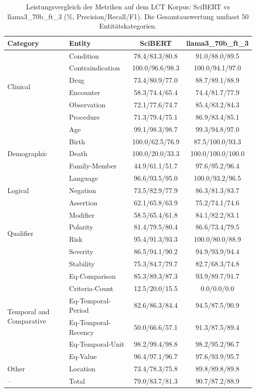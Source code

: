 
\begin{table}[htbp]
\centering
\begin{tabular}{llcc}
\toprule
\textbf{Category} & \textbf{Entity} & \textbf{SciBERT} & \textbf{llama3_70b_ft_3} \\
\midrule
\multirow{6}{*}{Clinical} & Condition & 78.4/83.3/80.8 & 91.0/88.0/89.5 \\
 & Contraindication & 100.0/96.6/98.3 & 100.0/94.1/97.0 \\
 & Drug & 73.4/80.9/77.0 & 88.7/89.1/88.9 \\
 & Encounter & 58.3/74.4/65.4 & 74.4/81.7/77.9 \\
 & Observation & 72.1/77.6/74.7 & 85.4/83.2/84.3 \\
 & Procedure & 71.3/79.4/75.1 & 86.9/83.4/85.1 \\
\midrule
\multirow{5}{*}{Demographic} & Age & 99.1/98.3/98.7 & 99.3/94.8/97.0 \\
 & Birth & 100.0/62.5/76.9 & 87.5/100.0/93.3 \\
 & Death & 100.0/20.0/33.3 & 100.0/100.0/100.0 \\
 & Family-Member & 44.9/61.1/51.7 & 97.6/95.2/96.4 \\
 & Language & 96.6/93.5/95.0 & 100.0/93.2/96.5 \\
\midrule
Logical & Negation & 73.5/82.9/77.9 & 86.3/81.3/83.7 \\
\midrule
\multirow{6}{*}{Qualifier} & Assertion & 62.1/65.8/63.9 & 75.2/74.1/74.6 \\
 & Modifier & 58.5/65.4/61.8 & 84.1/82.2/83.1 \\
 & Polarity & 81.4/79.5/80.4 & 86.6/73.4/79.5 \\
 & Risk & 95.4/91.3/93.3 & 100.0/80.0/88.9 \\
 & Severity & 86.5/94.1/90.2 & 94.9/93.9/94.4 \\
 & Stability & 75.3/84.7/79.7 & 82.7/68.3/74.8 \\
\midrule
\multirow{6}{*}{Temporal and Comparative} & Eq-Comparison & 85.3/89.3/87.3 & 93.9/89.7/91.7 \\
 & Criteria-Count & 12.5/20.0/15.5 & 0.0/0.0/0.0 \\
 & Eq-Temporal-Period & 82.6/86.3/84.4 & 94.5/87.5/90.9 \\
 & Eq-Temporal-Recency & 50.0/66.6/57.1 & 91.3/87.5/89.4 \\
 & Eq-Temporal-Unit & 98.2/99.4/98.8 & 98.2/95.2/96.7 \\
 & Eq-Value & 96.4/97.1/96.7 & 97.6/93.9/95.7 \\
\midrule
Other & Location & 73.4/78.3/75.8 & 89.8/89.8/89.8 \\
\midrule
-- & Total & 79.0/83.7/81.3 & 90.7/87.2/88.9 \\
\bottomrule
\end{tabular}
\caption{Leistungsvergleich der Metriken auf dem LCT Korpus: SciBERT vs llama3_70b_ft_3 (\%, Precision/Recall/F1). Die Gesamtauswertung umfasst 50 Entitätskategorien.}
\label{tab:metrics_comparison}
\end{table}
    